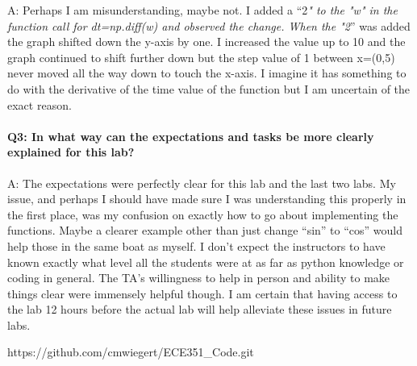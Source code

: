 \documentclass[11pt]{article}
\begin{document}
A: Perhaps I am misunderstanding, maybe not. I added a ``2\emph{" to the
"w" in the function call for dt=np.diff(w) and observed the change. When
the "2}'' was added the graph shifted down the y-axis by one. I
increased the value up to 10 and the graph continued to shift further
down but the step value of 1 between x=(0,5) never moved all the way
down to touch the x-axis. I imagine it has something to do with the
derivative of the time value of the function but I am uncertain of the
exact reason.

\hypertarget{q3-in-what-way-can-the-expectations-and-tasks-be-more-clearly-explained-for-this-lab}{%
\paragraph{Q3: In what way can the expectations and tasks be more
clearly explained for this
lab?}\label{q3-in-what-way-can-the-expectations-and-tasks-be-more-clearly-explained-for-this-lab}}

A: The expectations were perfectly clear for this lab and the last two
labs. My issue, and perhaps I should have made sure I was understanding
this properly in the first place, was my confusion on exactly how to go
about implementing the functions. Maybe a clearer example other than
just change ``sin'' to ``cos'' would help those in the same boat as
myself. I don't expect the instructors to have known exactly what level
all the students were at as far as python knowledge or coding in
general. The TA's willingness to help in person and ability to make
things clear were immensely helpful though. I am certain that having
access to the lab 12 hours before the actual lab will help alleviate
these issues in future labs.

    https://github.com/cmwiegert/ECE351\_Code.git


    
    
    
    
\end{document}
